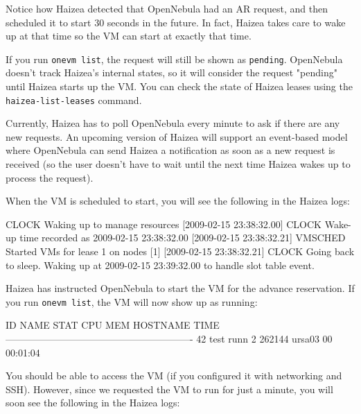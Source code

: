 Notice how Haizea detected that OpenNebula had an AR request, and then scheduled it to start 30 seconds in the future. In fact, Haizea takes care to wake up at that time so the VM can start at exactly that time.

\begin{warning}
If you run \texttt{onevm list}, the request will still be shown as \texttt{pending}. OpenNebula doesn't track Haizea's internal states, so it will consider the request "pending" until Haizea starts up the VM. You can check the state of Haizea leases using the \texttt{haizea-list-leases} command.
\end{warning}

\begin{warning}
Currently, Haizea has to poll OpenNebula every minute to ask if there are any new requests. An upcoming version of Haizea will support an event-based model where OpenNebula can send Haizea a notification as soon as a new request is received (so the user doesn't have to wait until the next time Haizea wakes up to process the request).
\end{warning}

When the VM is scheduled to start, you will see the following in the Haizea logs:

\begin{wideshellverbatim}
[2009-02-15 23:38:32.00] CLOCK   Waking up to manage resources
[2009-02-15 23:38:32.00] CLOCK   Wake-up time recorded as 2009-02-15 23:38:32.00
[2009-02-15 23:38:32.21] VMSCHED Started VMs for lease 1 on nodes [1]
[2009-02-15 23:38:32.21] CLOCK   Going back to sleep. 
                                 Waking up at 2009-02-15 23:39:32.00 
                                 to handle slot table event.
\end{wideshellverbatim}

Haizea has instructed OpenNebula to start the VM for the advance reservation. If you run \texttt{onevm list}, the VM will now show up as running:

\begin{wideshellverbatim}
  ID     NAME STAT CPU     MEM        HOSTNAME        TIME
----------------------------------------------------------
  42     test runn   2  262144          ursa03 00 00:01:04
\end{wideshellverbatim}

You should be able to access the VM (if you configured it with networking and SSH). However, since we requested the VM to run for just a minute, you will soon see the following in the Haizea logs:

